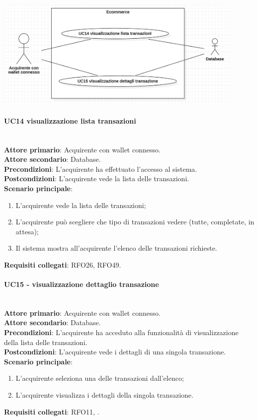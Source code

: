 \documentclass[a4paper, 12pt]{article}
\begin{document}
\includegraphics[width=0.9\textwidth]{UC_ECA2}

\paragraph{UC14 visualizzazione lista transazioni}\\
\textbf{Attore primario}: Acquirente con wallet connesso. \\
\textbf{Attore secondario}: Database. \\
\textbf{Precondizioni}: L'acquirente ha effettuato l'accesso al sistema.\\
\textbf{Postcondizioni}:  L'acquirente vede la lista delle transazioni.\\
\textbf{Scenario principale}:
\begin{enumerate}
\item L'acquirente vede la lista delle transazioni;
\item L'acquirente può scegliere che tipo di transazioni vedere (tutte, completate, in attesa);
\item Il sistema mostra all'acquirente l'elenco delle transazioni richieste.
\end{enumerate}
\textbf{Requisiti collegati}: RFO26, RFO49.

\paragraph{UC15 - visualizzazione dettaglio transazione}\\
\textbf{Attore primario}: Acquirente con wallet connesso.\\
\textbf{Attore secondario}: Database.\\
\textbf{Precondizioni}: L'acquirente ha acceduto alla funzionalità di visualizzazione della lista delle transazioni.\\
\textbf{Postcondizioni}: L'acquirente vede i dettagli di una singola transazione.\\
\textbf{Scenario principale}:
\begin{enumerate}
\item L'acquirente seleziona una delle transazioni dall'elenco;
\item L'acquirente visualizza i dettagli della singola transazione.
\end{enumerate}
\textbf{Requisiti collegati}: RFO11, .
\end{document}
